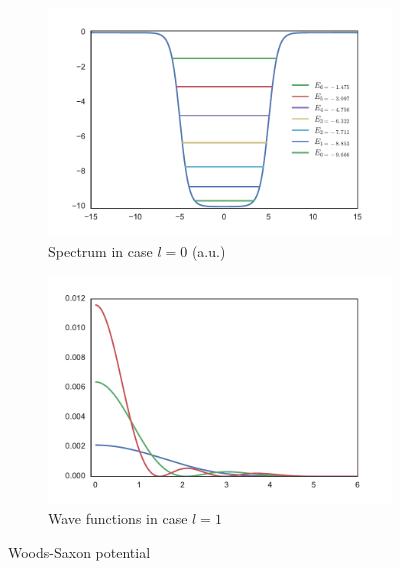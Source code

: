\documentclass[a4paper, 12pt]{article}
\begin{document}
\begin{figure}[h!] 
\centering
\begin{subfigure}{.5\textwidth}
  \centering
  \includegraphics[width=1.0\linewidth]{WS_poten.pdf}
  \caption{Spectrum in case $l=0$ (a.u.)}
\end{subfigure}%
\begin{subfigure}{.5\textwidth}
  \centering
  \includegraphics[width=1.0\linewidth]{WS_wave.pdf}
  \caption{Wave functions in case $l=1$}
\end{subfigure}
\caption{Woods-Saxon potential}
\label{fig:WS_potential1}
\end{figure}
\end{document}
